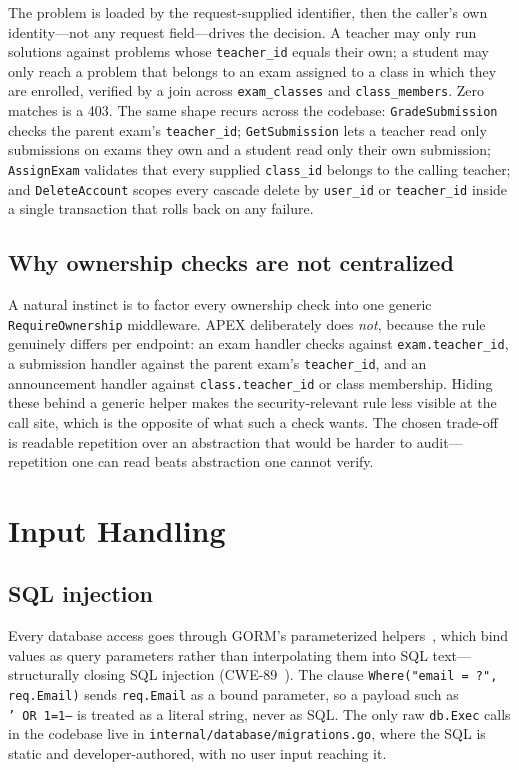 The problem is loaded by the request-supplied identifier, then the caller's own
identity---not any request field---drives the decision. A teacher may only run
solutions against problems whose \texttt{teacher\_id} equals their own; a student
may only reach a problem that belongs to an exam assigned to a class in which
they are enrolled, verified by a join across \texttt{exam\_classes} and
\texttt{class\_members}. Zero matches is a 403. The same shape recurs across the
codebase: \texttt{GradeSubmission} checks the parent exam's \texttt{teacher\_id};
\texttt{GetSubmission} lets a teacher read only submissions on exams they own and
a student read only their own submission; \texttt{AssignExam} validates that
every supplied \texttt{class\_id} belongs to the calling teacher; and
\texttt{DeleteAccount} scopes every cascade delete by \texttt{user\_id} or
\texttt{teacher\_id} inside a single transaction that rolls back on any failure.

\subsection{Why ownership checks are not centralized}

A natural instinct is to factor every ownership check into one generic
\texttt{RequireOwnership} middleware. APEX deliberately does \emph{not}, because
the rule genuinely differs per endpoint: an exam handler checks against
\texttt{exam.teacher\_id}, a submission handler against the parent exam's
\texttt{teacher\_id}, and an announcement handler against
\texttt{class.teacher\_id} or class membership. Hiding these behind a generic
helper makes the security-relevant rule less visible at the call site, which is
the opposite of what such a check wants. The chosen trade-off is readable
repetition over an abstraction that would be harder to audit---repetition one
can read beats abstraction one cannot verify.

\section{Input Handling}
\label{sec:input}

\subsection{SQL injection}

Every database access goes through GORM's parameterized helpers~\cite{gorm},
which bind values as query parameters rather than interpolating them into SQL
text---structurally closing SQL injection (CWE-89~\cite{cwe-89}). The clause
\texttt{Where("email = ?", req.Email)} sends \texttt{req.Email} as a bound
parameter, so a payload such as \texttt{'~OR~1=1--} is treated as a literal
string, never as SQL. The only raw \texttt{db.Exec} calls in the codebase live
in \texttt{internal/database/migrations.go}, where the SQL is static and
developer-authored, with no user input reaching it.

